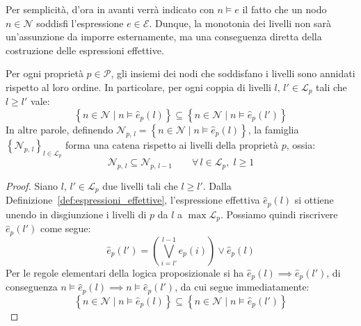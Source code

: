 Per semplicità, d'ora in avanti verrà indicato con $n \models e$ il fatto che un nodo $n \in \mathcal{N}$ soddisfi l'espressione $e \in \mathcal{E}$. Dunque, la monotonia dei livelli non sarà un'assunzione da imporre esternamente, ma una conseguenza diretta della costruzione delle espressioni effettive.

\begin{theorem}
    \label{teo:monotonia_livelli}
    Per ogni proprietà $p \in \mathcal{P}$, gli insiemi dei nodi che soddisfano i livelli sono annidati rispetto al loro ordine. In particolare, per ogni coppia di livelli $l,\, l' \in \mathcal{L}_p$ tali che $l \geq l'$ vale:
    \begin{equation}
        \left\{ n \in \mathcal{N} \mid n \models \hat{e}_p(l) \right\} 
        \subseteq 
        \left\{ n \in \mathcal{N} \mid n \models \hat{e}_p(l') \right\}
    \end{equation}
    In altre parole, definendo $\mathcal{N}_{p,\,l} = \left\{n \in \mathcal{N} \mid n \models \hat{e}_p(l) \right\}$, la famiglia $\left\{\mathcal{N}_{p,\,l}\right\}_{l \in \mathcal{L}_p}$ forma una catena rispetto ai livelli della proprietà $p$, ossia: 
    \begin{equation}
        \mathcal{N}_{p,\,l} \subseteq \mathcal{N}_{p,\,l-1} 
        \qquad 
        \forall\, l \in \mathcal{L}_p,\; l \geq 1
    \end{equation}
    \begin{proof}
        Siano $l,\, l' \in \mathcal{L}_p$ due livelli tali che $l \geq l'$. Dalla Definizione~\ref{def:espressioni_effettive}, l'espressione effettiva $\hat{e}_p(l)$ si ottiene unendo in disgiunzione i livelli di $p$ da $l$ a $\max \mathcal{L}_p$. Possiamo quindi riscrivere $\hat{e}_p(l')$ come segue:
        \begin{equation}
            \hat{e}_p(l') = \left( \bigvee_{i=l'}^{l-1} e_p(i) \right) \lor \hat{e}_p(l)
        \end{equation}
        Per le regole elementari della logica proposizionale si ha $\hat{e}_p(l) \implies \hat{e}_p(l')$, di conseguenza $n \models \hat{e}_p(l) \implies n \models \hat{e}_p(l')$, da cui segue immediatamente:
        \begin{equation}
            \left\{ n \in \mathcal{N} \mid n \models \hat{e}_p(l) \right\} \subseteq \left\{ n \in \mathcal{N} \mid n \models \hat{e}_p(l') \right\}
        \end{equation}
    \end{proof}
\end{theorem}

